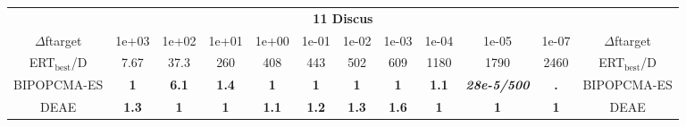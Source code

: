 \begin{tabular}{cccccccccccc}
 & \multicolumn{10}{c}{{\normalsize \textbf{11 Discus}}}\\
$\Delta$ftarget& 1e+03& 1e+02& 1e+01& 1e+00& 1e-01& 1e-02& 1e-03& 1e-04& 1e-05& 1e-07 & $\Delta$ftarget \\
ERT$_{\textrm{best}}$/D& 7.67& 37.3& 260& 408& 443& 502& 609& 1180& 1790& 2460 & ERT$_{\textrm{best}}$/D \\
\hline
BIPOPCMA-ES & \textbf{1} & \textbf{6.1} & \textbf{1.4} & \textbf{1} & \textbf{1} & \textbf{1} & \textbf{1} & \textbf{1.1} & \textbf{\textit{28e-5}\textit{/500}} & \textbf{.} & BIPOPCMA-ES \cite{add_an_entry_for_BIPOPCMA-ES_in_bbob.bib}\\
DEAE & \textbf{1.3} & \textbf{1} & \textbf{1} & \textbf{1.1} & \textbf{1.2} & \textbf{1.3} & \textbf{1.6} & \textbf{1} & \textbf{1} & \textbf{1} & DEAE \cite{add_an_entry_for_DEAE_in_bbob.bib}
\end{tabular}
